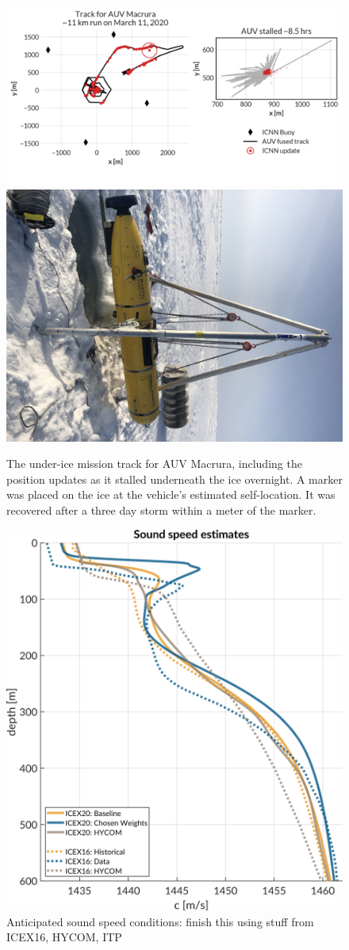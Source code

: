 \begin{figure}[h!]
	\centering
	\includegraphics[width=0.7\columnwidth]{figs/auv-track-update.png} \hfill
	\includegraphics[width=0.28\columnwidth]{figs/Fig1.jpg}
	\caption{The under-ice mission track for AUV Macrura, including the position updates as it stalled underneath the ice overnight. A marker was placed on the ice at the vehicle's estimated self-location. It was recovered after a three day storm within a meter of the marker.}
	\label{fig:vehicleRecovery}
\end{figure}

\begin{figure}[h!]
	\centering
	\includegraphics[width=\reprintcolumnwidth]{figs/ssp-gvel-icex20-icex16.pdf}
	\caption{Anticipated sound speed conditions: finish this using stuff from ICEX16, HYCOM, ITP}
	\label{fig:sspExpectation}
\end{figure}

